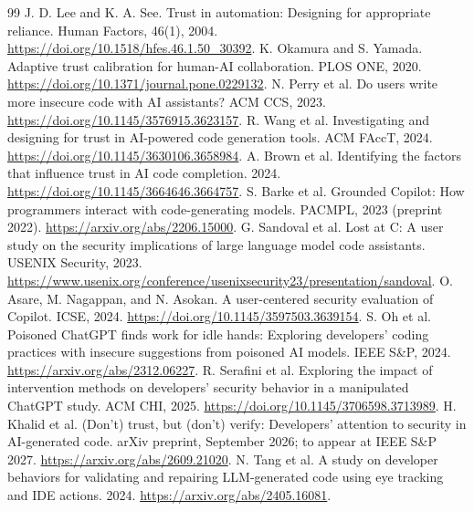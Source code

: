 \documentclass[12pt,a4paper]{article}
\begin{document}
\begingroup
\setlength{\parskip}{0pt}
\begin{thebibliography}{99}
\setlength{\itemsep}{0pt}
 J. D. Lee and K. A. See. Trust in automation: Designing for appropriate reliance. Human Factors, 46(1), 2004. \url{https://doi.org/10.1518/hfes.46.1.50_30392}.
 K. Okamura and S. Yamada. Adaptive trust calibration for human-AI collaboration. PLOS ONE, 2020. \url{https://doi.org/10.1371/journal.pone.0229132}.
 N. Perry et al. Do users write more insecure code with AI assistants? ACM CCS, 2023. \url{https://doi.org/10.1145/3576915.3623157}.
 R. Wang et al. Investigating and designing for trust in AI-powered code generation tools. ACM FAccT, 2024. \url{https://doi.org/10.1145/3630106.3658984}.
 A. Brown et al. Identifying the factors that influence trust in AI code completion. 2024. \url{https://doi.org/10.1145/3664646.3664757}.
 S. Barke et al. Grounded Copilot: How programmers interact with code-generating models. PACMPL, 2023 (preprint 2022). \url{https://arxiv.org/abs/2206.15000}.
 G. Sandoval et al. Lost at C: A user study on the security implications of large language model code assistants. USENIX Security, 2023. \url{https://www.usenix.org/conference/usenixsecurity23/presentation/sandoval}.
 O. Asare, M. Nagappan, and N. Asokan. A user-centered security evaluation of Copilot. ICSE, 2024. \url{https://doi.org/10.1145/3597503.3639154}.
 S. Oh et al. Poisoned ChatGPT finds work for idle hands: Exploring developers' coding practices with insecure suggestions from poisoned AI models. IEEE S\&P, 2024. \url{https://arxiv.org/abs/2312.06227}.
 R. Serafini et al. Exploring the impact of intervention methods on developers' security behavior in a manipulated ChatGPT study. ACM CHI, 2025. \url{https://doi.org/10.1145/3706598.3713989}.
 H. Khalid et al. (Don't) trust, but (don't) verify: Developers' attention to security in AI-generated code. arXiv preprint, September 2026; to appear at IEEE S\&P 2027. \url{https://arxiv.org/abs/2609.21020}.
 N. Tang et al. A study on developer behaviors for validating and repairing LLM-generated code using eye tracking and IDE actions. 2024. \url{https://arxiv.org/abs/2405.16081}.

\end{thebibliography}
\end{document}
